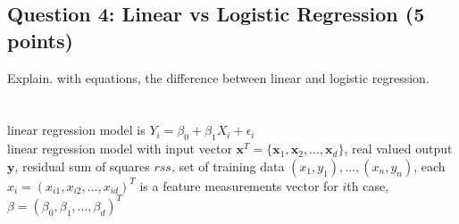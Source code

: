 \documentclass{article}
\begin{document}
\subsection*{Question 4: Linear vs Logistic Regression (5 points)}
Explain. with equations, the difference between linear and logistic regression.\\
\\
\\
linear regression model is $Y_i = \beta_0 + \beta_1X_i + \epsilon_i$\\
linear regression model with input vector $\textbf{x} ^ T = \{\textbf{x}_1, \textbf{x}_2, ..., \textbf{x}_d\}$, real valued output $\textbf{y}$, residual sum of squares $rss$, set of training data $(x_1, y_1), ..., (x_n, y_n)$, each $x_i = (x_{i1}, x_{i2}, ..., x_{id}) ^ T$ is a feature measurements vector for $i$th case, $\beta = (\beta_0, \beta_1, ..., \beta_d) ^ T$
\end{document}
